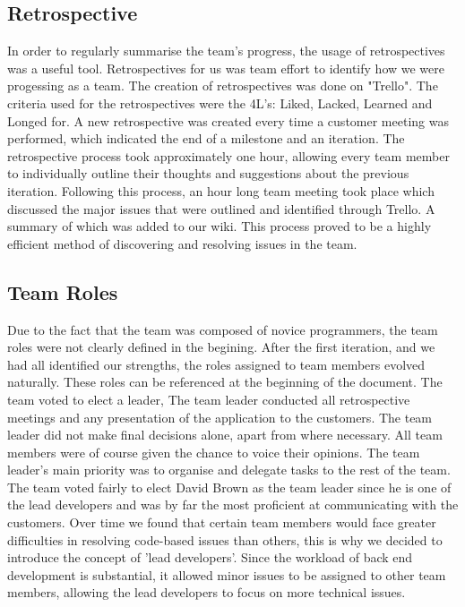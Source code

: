 \documentclass{l3proj}
\begin{document}
\subsection{Retrospective}
\label{retrospective}

In order to regularly summarise the team's progress, the usage of retrospectives was a useful tool. Retrospectives for us was team effort to identify how we were progessing as a team. The creation of retrospectives was done on "Trello". The criteria used for the retrospectives were the 4L's: Liked, Lacked, Learned and Longed for. A new retrospective was created every time a customer meeting was performed, which indicated the end of a milestone and an iteration. The retrospective process took approximately one hour, allowing every team member to individually outline their thoughts and suggestions about the previous iteration. Following this process, an hour long team meeting took place which discussed the major issues that were outlined and identified through Trello. A summary of which was added to our wiki. This process proved to be a highly efficient method of discovering and resolving issues in the team.

\subsection{Team Roles}
\label{sec:roles}

Due to the fact that the team was composed of novice programmers, the team roles were not clearly defined in the begining. After the first iteration, and we had all identified our strengths, the roles assigned to team members evolved naturally. These roles can be referenced at the beginning of the document. The team voted to elect a leader, The team leader conducted all retrospective meetings and any presentation of the application to the customers. The team leader did not make final decisions alone, apart from where necessary. All team members were of course given the chance to voice their opinions. The team leader's main priority was to organise and delegate tasks to the rest of the team. The team voted fairly to elect David Brown as the team leader since he is one of the lead developers and was by far the most proficient at communicating with the customers. Over time we found that certain team members would face greater difficulties in resolving code-based issues than others, this is why we decided to introduce the concept of 'lead developers'. Since the workload of back end development is substantial, it allowed minor issues to be assigned to other team members, allowing the lead developers to focus on more technical issues.
\end{document}
